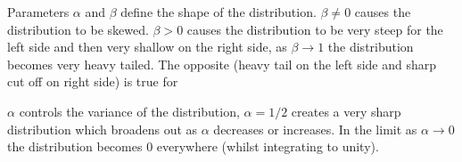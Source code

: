 \documentclass[12pt]{article}
\begin{document}
\begin{enumerate}
Parameters $\alpha$ and $\beta$ define the shape of the distribution. $\beta \ne 0$ causes the distribution to be skewed. $\beta > 0$ causes the distribution to be very steep for the left side and then very shallow on the right side, as $\beta \to 1$ the distribution becomes very heavy tailed. The opposite (heavy tail on the left side and sharp cut off on right side) is true for 

$\alpha$ controls the variance of the distribution, $\alpha=1/2$ creates a very sharp distribution which broadens out as $\alpha$ decreases or increases. In the limit as  $\alpha \to 0$ the distribution becomes  0 everywhere (whilst integrating to unity).

\end{enumerate}
\end{document}
